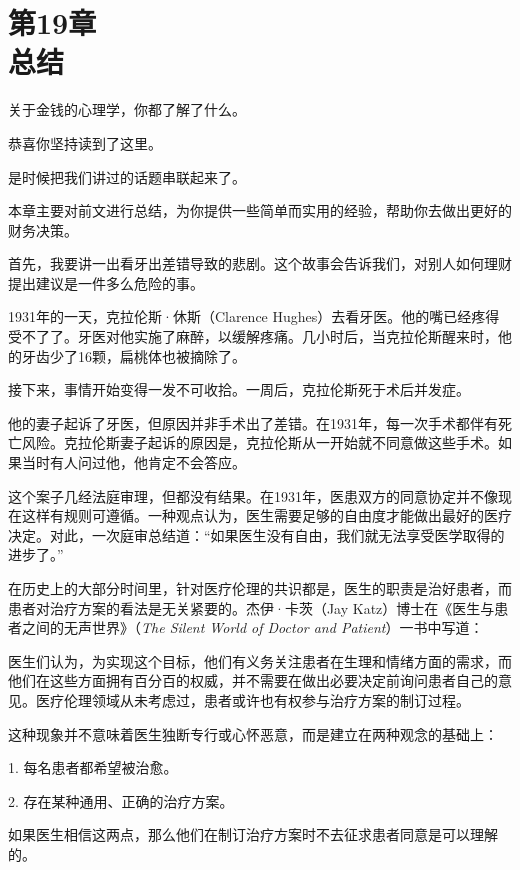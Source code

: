 
\section[第19章\q 总结]{第19章\\ 总结}

{\kaishu

关于金钱的心理学，你都了解了什么。

}

恭喜你坚持读到了这里。

是时候把我们讲过的话题串联起来了。

本章主要对前文进行总结，为你提供一些简单而实用的经验，帮助你去做出更好的财务决策。

首先，我要讲一出看牙出差错导致的悲剧。这个故事会告诉我们，对别人如何理财提出建议是一件多么危险的事。

1931年的一天，克拉伦斯·休斯（Clarence Hughes）去看牙医。他的嘴已经疼得受不了了。牙医对他实施了麻醉，以缓解疼痛。几小时后，当克拉伦斯醒来时，他的牙齿少了16颗，扁桃体也被摘除了。

接下来，事情开始变得一发不可收拾。一周后，克拉伦斯死于术后并发症。

他的妻子起诉了牙医，但原因并非手术出了差错。在1931年，每一次手术都伴有死亡风险。克拉伦斯妻子起诉的原因是，克拉伦斯从一开始就不同意做这些手术。如果当时有人问过他，他肯定不会答应。

这个案子几经法庭审理，但都没有结果。在1931年，医患双方的同意协定并不像现在这样有规则可遵循。一种观点认为，医生需要足够的自由度才能做出最好的医疗决定。对此，一次庭审总结道：“如果医生没有自由，我们就无法享受医学取得的进步了。”

在历史上的大部分时间里，针对医疗伦理的共识都是，医生的职责是治好患者，而患者对治疗方案的看法是无关紧要的。杰伊·卡茨（Jay Katz）博士在《医生与患者之间的无声世界》（\textit{The Silent World of Doctor and Patient}）一书中写道：

{\kaishu

医生们认为，为实现这个目标，他们有义务关注患者在生理和情绪方面的需求，而他们在这些方面拥有百分百的权威，并不需要在做出必要决定前询问患者自己的意见。医疗伦理领域从未考虑过，患者或许也有权参与治疗方案的制订过程。

}

这种现象并不意味着医生独断专行或心怀恶意，而是建立在两种观念的基础上：

1. 每名患者都希望被治愈。

2. 存在某种通用、正确的治疗方案。

如果医生相信这两点，那么他们在制订治疗方案时不去征求患者同意是可以理解的。

